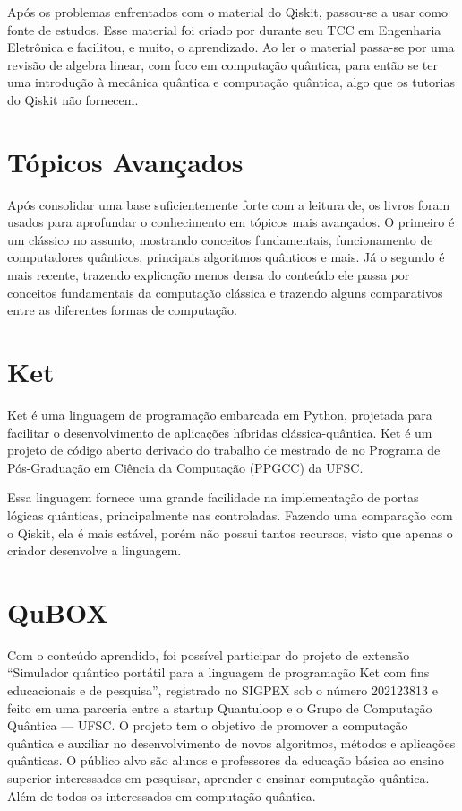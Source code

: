 Após os problemas enfrentados com o material do Qiskit, passou-se a usar\cite{giovani} como fonte de estudos.
Esse material foi criado por \citeauthor{giovani} durante seu TCC em Engenharia Eletrônica e facilitou, e muito, o aprendizado.
Ao ler o material passa-se por uma revisão de algebra linear, com foco em computação quântica, para então se ter uma introdução à mecânica quântica e computação quântica, algo que os tutorias do Qiskit não fornecem.

\section{Tópicos Avançados}\label{sec:topicos-avancados}

Após consolidar uma base suficientemente forte com a leitura de\cite{giovani}, os livros\cite{nielsen_chuang_2010, thomas-wong} foram usados para aprofundar o conhecimento em tópicos mais avançados.
O primeiro é um clássico no assunto, mostrando conceitos fundamentais, funcionamento de computadores quânticos, principais algoritmos quânticos e mais.
Já o segundo é mais recente, trazendo explicação menos densa do conteúdo ele passa por conceitos fundamentais da computação clássica e trazendo alguns comparativos entre as diferentes formas de computação.

\section{Ket}\label{sec:ket}

Ket é uma linguagem de programação embarcada em Python, projetada para facilitar o desenvolvimento de aplicações híbridas clássica-quântica.
Ket é um projeto de código aberto derivado do trabalho de mestrado de \citeauthor{ket} no Programa de Pós-Graduação em Ciência da Computação (PPGCC) da UFSC.

Essa linguagem fornece uma grande facilidade na implementação de portas lógicas quânticas, principalmente nas controladas.
Fazendo uma comparação com o Qiskit, ela é mais estável, porém não possui tantos recursos, visto que apenas o criador desenvolve a linguagem.

\section{QuBOX}\label{sec:qubox}

Com o conteúdo aprendido, foi possível participar do projeto de extensão “Simulador quântico portátil para a linguagem de programação Ket com fins educacionais e de pesquisa”, registrado no SIGPEX sob o número 202123813 e feito em uma parceria entre a startup Quantuloop e o Grupo de Computação Quântica — UFSC.
O projeto tem o objetivo de promover a computação quântica e auxiliar no desenvolvimento de novos algoritmos, métodos e aplicações quânticas.
O público alvo são alunos e professores da educação básica ao ensino superior interessados em pesquisar, aprender e ensinar computação quântica.
Além de todos os interessados em computação quântica.

